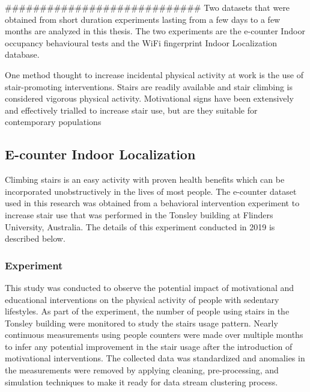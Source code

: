 \documentclass[../UNBThesis2.tex]{subfiles}
\begin{document}
############################
Two datasets that were obtained from short duration experiments lasting from a few days to a few months are analyzed in this thesis. The two experiments are the e-counter Indoor occupancy behavioural tests and the WiFi fingerprint Indoor Localization database. 

One method thought to increase incidental physical activity at work is the use of stair-promoting interventions. Stairs are readily available and stair climbing is considered vigorous physical activity. Motivational signs have been extensively and effectively trialled to increase stair use, but are they suitable for contemporary populations


\subsection{E-counter Indoor Localization}
Climbing stairs is an easy activity with proven health benefits which can be incorporated unobstructively in the lives of most people. The e-counter dataset used in this research was obtained from a behavioral intervention experiment to increase stair use that was performed in the Tonsley building at Flinders University, Australia. The details of this experiment conducted in 2019 is described below.


\subsubsection{Experiment}
 This study was conducted to observe the potential impact of motivational and educational interventions on the physical activity of people with sedentary lifestyles. As part of the experiment, the number of people using stairs in the Tonsley building were monitored to study the stairs usage pattern. Nearly continuous measurements using people counters were made over multiple months to infer any potential improvement in the stair usage after the introduction of motivational interventions. The collected data was standardized and anomalies in the measurements were removed by applying cleaning, pre-processing, and simulation techniques to make it ready for data stream clustering process.
\end{document}
